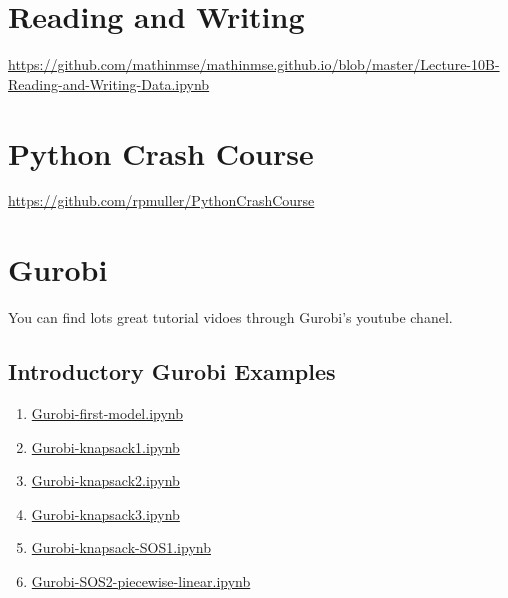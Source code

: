 \section{Reading and Writing}
\url{https://github.com/mathinmse/mathinmse.github.io/blob/master/Lecture-10B-Reading-and-Writing-Data.ipynb}

\section{Python Crash Course}
\url{https://github.com/rpmuller/PythonCrashCourse}


\section{Gurobi}
You can find lots great tutorial vidoes through Gurobi's youtube chanel.  


\subsection{Introductory Gurobi Examples}
\begin{enumerate}
\item \href{https://github.com/open-optimization/open-optimization-or-examples/blob/master/gurobi_helper_files/Gurobi-first-model.ipynb}{Gurobi-first-model.ipynb}
\item \href{https://github.com/open-optimization/open-optimization-or-examples/blob/master/gurobi_helper_files/Gurobi-knapsack1.ipynb}{Gurobi-knapsack1.ipynb}
\item \href{https://github.com/open-optimization/open-optimization-or-examples/blob/master/gurobi_helper_files/Gurobi-knapsack2.ipynb}{Gurobi-knapsack2.ipynb}
\item \href{https://github.com/open-optimization/open-optimization-or-examples/blob/master/gurobi_helper_files/Gurobi-knapsack3-Copy1.ipynb}{Gurobi-knapsack3.ipynb}
\item \href{https://github.com/open-optimization/open-optimization-or-examples/blob/master/gurobi_helper_files/Gurobi-knapsack-SOS1.ipynb}{Gurobi-knapsack-SOS1.ipynb}
\item \href{https://github.com/open-optimization/open-optimization-or-examples/blob/master/gurobi_helper_files/Gurobi-SOS2-piecewise-linear.ipynb}{Gurobi-SOS2-piecewise-linear.ipynb}
\end{enumerate}

